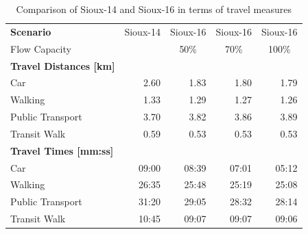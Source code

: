 \begin{table}[]
\centering
\caption{Comparison of Sioux-14 and Sioux-16 in terms of travel measures}
\label{tab:sioux}
\begin{tabular}{@{}lrrrr@{}}
\toprule
\textbf{Scenario}                  & \multicolumn{1}{c}{Sioux-14} & \multicolumn{1}{c}{Sioux-16} & \multicolumn{1}{c}{Sioux-16} & \multicolumn{1}{c}{Sioux-16} \\
Flow Capacity                      & \multicolumn{1}{c}{}         & \multicolumn{1}{c}{50\%}     & \multicolumn{1}{c}{70\%}     & \multicolumn{1}{c}{100\%}    \\ \midrule
\textbf{Travel Distances {[}km{]}} & \multicolumn{1}{l}{}         & \multicolumn{1}{l}{}         & \multicolumn{1}{l}{}         & \multicolumn{1}{l}{}         \\
Car                                & 2.60                         & 1.83                         & 1.80                         & 1.79                         \\
Walking                            & 1.33                         & 1.29                         & 1.27                         & 1.26                         \\
Public Transport                   & 3.70                         & 3.82                         & 3.86                         & 3.89                         \\
Transit Walk                       & 0.59                         & 0.53                         & 0.53                         & 0.53                         \\\midrule
\textbf{Travel Times {[}mm:ss{]}}  & \multicolumn{1}{l}{}         & \multicolumn{1}{l}{}         & \multicolumn{1}{l}{}         & \multicolumn{1}{l}{}         \\
Car                                & 09:00                        & 08:39                        & 07:01                        & 05:12                        \\
Walking                            & 26:35                        & 25:48                        & 25:19                        & 25:08                        \\
Public Transport                   & 31:20                        & 29:05                        & 28:32                        & 28:14                        \\
Transit Walk                       & 10:45                        & 09:07                        & 09:07                        & 09:06                        \\\midrule

\end{tabular}
\end{table}
